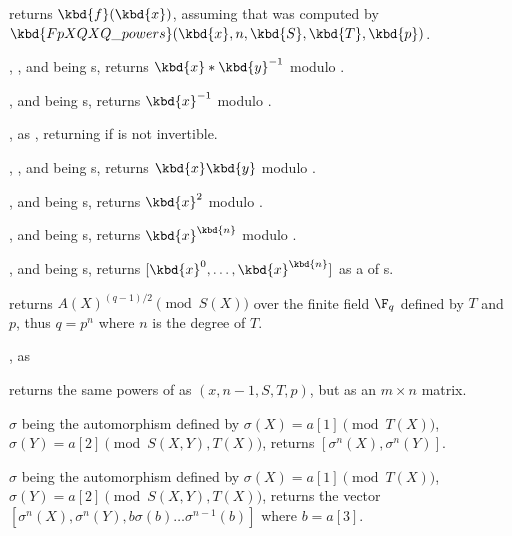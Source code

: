 
 returns
$\kbd{f}(\kbd{x})$, assuming that  was computed by
$\kbd{FpXQXQ\_powers}(\kbd{x}, n, \kbd{S}, \kbd{T}, \kbd{p})$.

, ,  and
 being s, returns $\kbd{x}*\kbd{y}^{-1}$ modulo .

,  and
 being s, returns $\kbd{x}^{-1}$ modulo .

, as ,
returning  if  is not invertible.

, ,  and
 being s, returns $\kbd{x}\*\kbd{y}$ modulo .

,  and
 being s, returns $\kbd{x}^2$ modulo .

,  and
 being s, returns $\kbd{x}^\kbd{n}$ modulo .

,  and
 being s, returns $[\kbd{x}^0, \dots, \kbd{x}^\kbd{n}]$ as a
 of s.

 returns
$A(X)^{(q-1)/2}\pmod{S(X)}$ over the finite field $\F_q$ defined by $T$
and $p$, thus $q=p^n$ where $n$ is the degree of $T$.

, as

returns the same powers of  as $(x, n-1,S, T, p)$,
but as an $m\times n$ matrix.

$\sigma$ being the automorphism defined by $\sigma(X)=a[1]\pmod{T(X)}$,
$\sigma(Y)=a[2]\pmod{S(X,Y),T(X)}$, returns $[\sigma^n(X),\sigma^n(Y)]$.

$\sigma$ being the automorphism defined by $\sigma(X)=a[1]\pmod{T(X)}$,
$\sigma(Y)=a[2]\pmod{S(X,Y),T(X)}$, returns the vector
$[\sigma^n(X),\sigma^n(Y),b\sigma(b)\ldots\sigma^{n-1}(b)]$
where $b=a[3]$.

